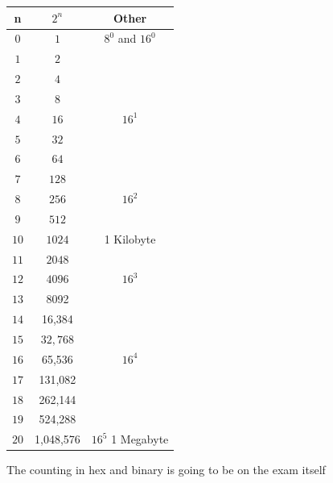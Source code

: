 \documentclass[letterpaper,12pt]{exam}
\begin{document}
\begin{center}
\begin{tabular}{| c | c | c |}
    \hline
        n & $2^n$ & Other \\
        \hline
    $0$ & $ 1 $ & $8^0$ and $16^0$ \\ 
    $1$ & $ 2 $ & \  \\ 
\hline
    $2$ & $ 4 $ & \  \\ 
    $3$ & $ 8 $ & \  \\ 
\hline
    $4$ & $ 16 $ & $16^1$ \\ 
    $5$ & $ 32 $ & \  \\ 
\hline
    $6$ & $ 64 $ & \  \\ 
    $7$ & $ 128 $ & \  \\ 
\hline
    $8$ & $ 256 $ & $16^2$ \\ 
    $9$ & $ 512 $ & \  \\ 
\hline
    $10$ & $ 1024 $ & 1 Kilobyte \\ 
    $11$ & $ 2048 $ & \  \\ 
\hline
    $12$ & $ 4096 $ & $16^3$ \\ 
    $13$ & {\color{lightgray}  8092}  & \  \\ 
\hline
    $14$ &  {\color{lightgray}  16,384} & \  \\ 
    $15$ & $ 32,768 $ & \  \\ 
\hline
    $16$ &   65,536  & $16^4$ \\ 
    $17$ & {\color{lightgray} 131,082 } & \  \\ 
\hline
      $18$ &   {\color{lightgray}  262,144} & \  \\ 
    $19$ &  {\color{lightgray} 524,288 } & \  \\ 
\hline
      $20$ & 1,048,576  & $16^5$ 1 Megabyte \\  
\hline
    \end{tabular}
\end{center}
\par
\begin{center}
The counting in hex and binary is going to be on the exam itself
\end{center}
\end{document}
